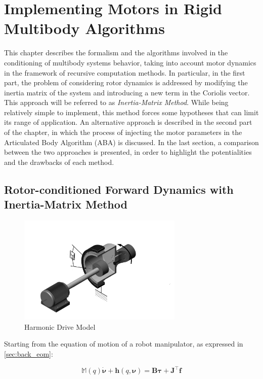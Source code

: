 \chapter{Implementing Motors in Rigid Multibody Algorithms}
\label{chp:contrib_ABA}

This chapter describes the formalism and the algorithms involved in the conditioning of multibody systems behavior, taking into account motor dynamics in the framework of recursive computation methods. In particular, in the first part, the problem of considering rotor dynamics is addressed by modifying the inertia matrix of the system and introducing a new term in the Coriolis vector. This approach will be referred to as \textit{Inertia-Matrix Method}. While being relatively simple to implement, this method forces some hypotheses that can limit its range of application. An alternative approach is described in the second part of the chapter, in which the process of injecting the motor parameters in the Articulated Body Algorithm (\ac{ABA}) is discussed. In the last section, a comparison between the two approaches is presented, in order to highlight the potentialities and the drawbacks of each method.

\section{Rotor-conditioned Forward Dynamics with Inertia-Matrix Method}

\begin{figure}
    \centering
    \caption{Harmonic Drive Model}
    \label{fig:harmonic_drive}
    \includegraphics[width=0.7\textwidth]{Images/harmonic_drive.png}
\end{figure}

Starting from the equation of motion of a robot manipulator, as expressed in \cref{sec:back_eom}:

\begin{equation}
    \mathbb{M}(q)\dot{\boldsymbol{\nu}} + \mathbf{h}(q,\boldsymbol{\nu}) = \mathbf{B}\boldsymbol{\tau} + \mathbf{J} ^\top \mathbf{f}
\end{equation}

